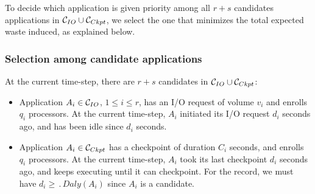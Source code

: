 To decide which application is given priority among all $r+s$ candidates
applications in $\mathcal{C}_{IO} \cup \mathcal{C}_{Ckpt}$, we select the one that
minimizes the total expected waste induced, as explained below.

\subsubsection{Selection among candidate applications}

At the current time-step, there are $r+s$ candidates in $\mathcal{C}_{IO} \cup \mathcal{C}_{Ckpt}$:
\begin{itemize}
%
  \item Application $A_{i} \in \mathcal{C}_{IO}$, $1\leq i \leq r$, has an I/O request
  of volume $v_{i}$ and enrolls $q_{i}$ processors. At the current time-step,
  $A_{i}$ initiated its I/O request $d_{i}$ seconds ago, and has been idle since
  $d_{i}$ seconds.
%
 \item Application $A_{i} \in  \mathcal{C}_{Ckpt}$ has a checkpoint of duration $C_{i}$
 seconds, and enrolls $q_{i}$ processors. At the current time-step, $A_{i}$ took
 its last checkpoint $d_{i}$ seconds ago, and keeps executing until it can
 checkpoint. For the record, we must have $d_{i} \geq \period{Daly}(A_{i})$
 since $A_{i}$ is a candidate.
%
\end{itemize}

